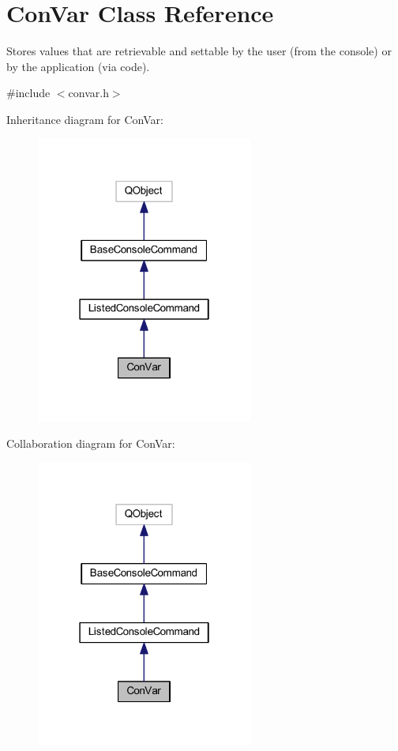 \hypertarget{class_con_var}{\section{Con\-Var Class Reference}
\label{class_con_var}
}


Stores values that are retrievable and settable by the user (from the console) or by the application (via code).  




{\ttfamily \#include $<$convar.\-h$>$}



Inheritance diagram for Con\-Var\-:\nopagebreak
\begin{figure}[H]
\begin{center}
\leavevmode
\includegraphics[width=202pt]{class_con_var__inherit__graph}
\end{center}
\end{figure}


Collaboration diagram for Con\-Var\-:\nopagebreak
\begin{figure}[H]
\begin{center}
\leavevmode
\includegraphics[width=202pt]{class_con_var__coll__graph}
\end{center}
\end{figure}
